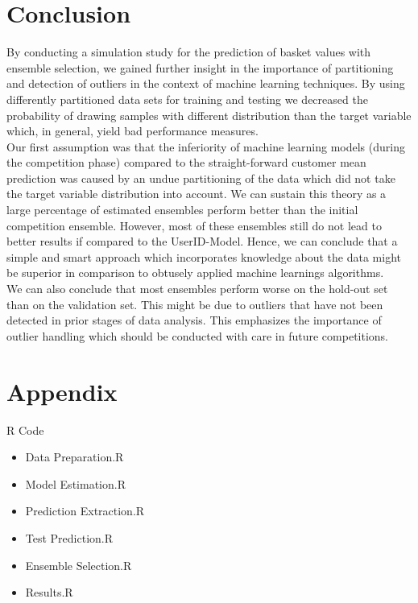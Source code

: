 \documentclass[12pt]{article}
\begin{document}
\section{Conclusion}

By conducting a simulation study for the prediction of basket values with ensemble selection, we gained further insight in the importance of partitioning and detection of outliers in the context of machine learning techniques. By using differently partitioned data sets for training and testing we decreased the probability of drawing samples with different distribution than the target variable which, in general, yield bad performance measures.\\

Our first assumption was that the inferiority of machine learning models (during the competition phase) compared to the straight-forward customer mean prediction was caused by an undue partitioning of the data which did not take the target variable distribution into account. We can sustain this theory as a large percentage of estimated ensembles perform better than the initial competition ensemble. However, most of these ensembles still do not lead to better results if compared to the UserID-Model. Hence, we can conclude that a simple and smart approach which incorporates knowledge about the data might be superior in comparison to obtusely applied machine learnings algorithms. \\

We can also conclude that most ensembles perform worse on the hold-out set than on the validation set. This might be due to outliers that have not been detected in prior stages of data analysis. This emphasizes the importance of outlier handling which should be conducted with care in future competitions.

\nocite{Caruana2006}
\nocite{Niculescu-Mizil2009}

\newpage
\appendix
\section{Appendix}
R Code

\begin{itemize}
	\item Data Preparation.R
    \item Model Estimation.R
    \item Prediction Extraction.R
    \item Test Prediction.R
    \item Ensemble Selection.R
    \item Results.R
\end{itemize}

\newpage

\newpage

\newpage

\newpage

\newpage

\newpage


\newpage

\end{document}

